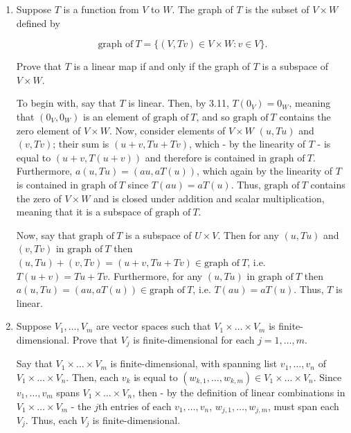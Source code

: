 \documentclass{book}
\begin{document}
\begin{enumerate}

\item Suppose \(T\) is a function from \(V\) to \(W\).  The graph of \(T\) is the subset of \(V \times W\) defined by

\begin{equation*}
    \text{graph of} \ T = \{(V,Tv) \in V \times W: v \in V\}.
\end{equation*}

Prove that \(T\) is a linear map if and only if the graph of \(T\) is a subspace of \(V \times W\).

To begin with, say that \(T\) is linear.  Then, by 3.11, \(T(0_V)=0_W\), meaning that \((0_V,0_W)\) is an element of \(\textrm{graph of} \ T\), and so \(\textrm{graph of} \ T\) contains the zero element of \(V \times W\).  Now, consider elements of \(V \times W\) \((u,Tu)\) and \((v,Tv)\); their sum is \((u+v,Tu+Tv)\), which - by the linearity of \(T\) - is equal to \((u+v,T(u+v))\) and therefore is contained in \(\textrm{graph of} \ T\).  Furthermore, \(a(u,Tu)=(au,aT(u))\), which again by the linearity of \(T\) is contained in \(\textrm{graph of} \ T\) since \(T(au)=aT(u)\).  Thus, \(\textrm{graph of} \ T\) contains the zero of \(V \times W\) and is closed under addition and scalar multiplication, meaning that it is a subspace of \(\textrm{graph of} \ T\).

Now, say that \(\textrm{graph of} \ T\) is a subspace of \(U \times V\).  Then for any \((u,Tu)\) and \((v,Tv)\) in \(\textrm{graph of} \ T\) then \((u,Tu)+(v,Tv)=(u+v,Tu+Tv) \in \textrm{graph of} \ T\), i.e. \(T(u+v)=Tu+Tv\).  Furthermore, for any \((u,Tu)\) in \(\textrm{graph of} \ T\) then \(a(u,Tu)=(au,aT(u)) \in \textrm{graph of} \ T\), i.e. \(T(au)=aT(u)\).  Thus, \(T\) is linear.

\item Suppose \(V_1,\dots,V_m\) are vector spaces such that \(V_1 \times \dots \times V_m\) is finite-dimensional.  Prove that \(V_j\) is finite-dimensional for each \(j=1,\dots,m\).

Say that \(V_1 \times \dots \times V_m\) is finite-dimensional, with spanning list \(v_1,\dots,v_n\) of \(V_1 \times \dots \times V_n\).  Then, each \(v_k\) is equal to \((w_{k,1},\dots,w_{k,m}) \in V_1 \times \dots \times V_n\).  Since \(v_1,\dots,v_m\) spans \(V_1 \times \dots \times V_n\), then - by the definition of linear combinations in \(V_1 \times \dots \times V_m\) - the \(j\)th entries of each \(v_1,\dots,v_n\), \(w_{j,1},\dots,w_{j,m}\), must span each \(V_j\).  Thus, each \(V_j\) is finite-dimensional.


\end{enumerate}
\end{document}
